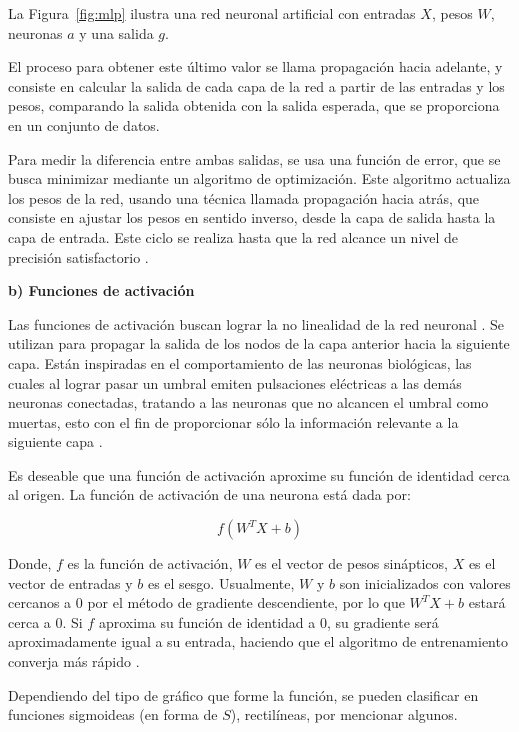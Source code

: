 La Figura~\ref{fig:mlp} ilustra una red neuronal artificial con entradas $X$, pesos $W$, neuronas $a$ y una salida $g$.

El proceso para obtener este último valor se llama propagación hacia adelante, y consiste en calcular la salida de cada capa de la red a partir de las entradas y los pesos, comparando la salida obtenida con la salida esperada, que se proporciona en un conjunto de datos.

Para medir la diferencia entre ambas salidas, se usa una función de error, que se busca minimizar mediante un algoritmo de optimización. Este algoritmo actualiza los pesos de la red, usando una técnica llamada propagación hacia atrás, que consiste en ajustar los pesos en sentido inverso, desde la capa de salida hasta la capa de entrada. Este ciclo se realiza hasta que la red alcance un nivel de precisión satisfactorio \cite{rashid2016make}.

\textbf{b) Funciones de activación}

Las funciones de activación buscan lograr la no linealidad de la red neuronal \cite{patterson2017deep}. Se utilizan para propagar la salida de los nodos de la capa anterior hacia la siguiente capa. Están inspiradas en el comportamiento de las neuronas biológicas, las cuales al lograr pasar un umbral emiten pulsaciones eléctricas a las demás neuronas conectadas, tratando a las neuronas que no alcancen el umbral como muertas, esto con el fin de proporcionar sólo la información relevante a la siguiente capa \cite{rashid2016make}.

Es deseable que una función de activación aproxime su función de identidad cerca al origen. La función de activación de una neurona está dada por:

\begin{equation}
    f(W^T X + b)
\end{equation}

Donde, $f$ es la función de activación, $W$ es el vector de pesos sinápticos, $X$ es el vector de entradas y $b$ es el sesgo. Usualmente, $W$ y $b$ son inicializados con valores cercanos a $0$ por el método de gradiente descendiente, por lo que $W^T X + b$ estará cerca a 0. Si $f$ aproxima su función de identidad a 0, su gradiente será aproximadamente igual a su entrada, haciendo que el algoritmo de entrenamiento converja más rápido \cite{aghdam2017guide}.

Dependiendo del tipo de gráfico que forme la función, se pueden clasificar en funciones sigmoideas (en forma de $S$), rectilíneas, por mencionar algunos.

